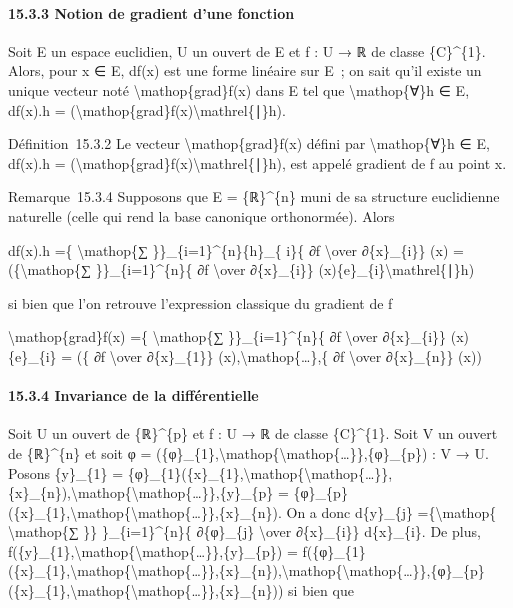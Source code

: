 \documentclass[]{article}
\begin{document}
\paragraph{15.3.3 Notion de gradient d'une fonction}

Soit E un espace euclidien, U un ouvert de E et f : U → ℝ de classe
\{C\}\^{}\{1\}. Alors, pour x ∈ E, df(x) est une forme linéaire sur E~;
on sait qu'il existe un unique vecteur noté
\textbackslash{}mathop\{grad\}f(x) dans E tel que
\textbackslash{}mathop\{∀\}h ∈ E, df(x).h =
(\textbackslash{}mathop\{grad\}f(x)\textbackslash{}mathrel\{∣\}h).

Définition~15.3.2 Le vecteur \textbackslash{}mathop\{grad\}f(x) défini
par \textbackslash{}mathop\{∀\}h ∈ E, df(x).h =
(\textbackslash{}mathop\{grad\}f(x)\textbackslash{}mathrel\{∣\}h), est
appelé gradient de f au point x.

Remarque~15.3.4 Supposons que E = \{ℝ\}\^{}\{n\} muni de sa structure
euclidienne naturelle (celle qui rend la base canonique orthonormée).
Alors

df(x).h =\{ \textbackslash{}mathop\{∑ \}\}\_\{i=1\}\^{}\{n\}\{h\}\_\{
i\}\{ ∂f \textbackslash{}over ∂\{x\}\_\{i\}\} (x) =
(\{\textbackslash{}mathop\{∑ \}\}\_\{i=1\}\^{}\{n\}\{ ∂f
\textbackslash{}over ∂\{x\}\_\{i\}\}
(x)\{e\}\_\{i\}\textbackslash{}mathrel\{∣\}h)

si bien que l'on retrouve l'expression classique du gradient de f

\textbackslash{}mathop\{grad\}f(x) =\{ \textbackslash{}mathop\{∑
\}\}\_\{i=1\}\^{}\{n\}\{ ∂f \textbackslash{}over ∂\{x\}\_\{i\}\}
(x)\{e\}\_\{i\} = (\{ ∂f \textbackslash{}over ∂\{x\}\_\{1\}\}
(x),\textbackslash{}mathop\{\ldots{}\},\{ ∂f \textbackslash{}over
∂\{x\}\_\{n\}\} (x))

\paragraph{15.3.4 Invariance de la différentielle}

Soit U un ouvert de \{ℝ\}\^{}\{p\} et f : U → ℝ de classe
\{C\}\^{}\{1\}. Soit V un ouvert de \{ℝ\}\^{}\{n\} et soit φ =
(\{φ\}\_\{1\},\textbackslash{}mathop\{\textbackslash{}mathop\{\ldots{}\}\},\{φ\}\_\{p\})
: V → U. Posons \{y\}\_\{1\} =
\{φ\}\_\{1\}(\{x\}\_\{1\},\textbackslash{}mathop\{\textbackslash{}mathop\{\ldots{}\}\},\{x\}\_\{n\}),\textbackslash{}mathop\{\textbackslash{}mathop\{\ldots{}\}\},\{y\}\_\{p\}
=
\{φ\}\_\{p\}(\{x\}\_\{1\},\textbackslash{}mathop\{\textbackslash{}mathop\{\ldots{}\}\},\{x\}\_\{n\}).
On a donc d\{y\}\_\{j\} =\{\textbackslash{}mathop\{
\textbackslash{}mathop\{∑ \}\} \}\_\{i=1\}\^{}\{n\}\{ ∂\{φ\}\_\{j\}
\textbackslash{}over ∂\{x\}\_\{i\}\} d\{x\}\_\{i\}. De plus,
f(\{y\}\_\{1\},\textbackslash{}mathop\{\textbackslash{}mathop\{\ldots{}\}\},\{y\}\_\{p\})
=
f(\{φ\}\_\{1\}(\{x\}\_\{1\},\textbackslash{}mathop\{\textbackslash{}mathop\{\ldots{}\}\},\{x\}\_\{n\}),\textbackslash{}mathop\{\textbackslash{}mathop\{\ldots{}\}\},\{φ\}\_\{p\}(\{x\}\_\{1\},\textbackslash{}mathop\{\textbackslash{}mathop\{\ldots{}\}\},\{x\}\_\{n\}))
si bien que
\end{document}

